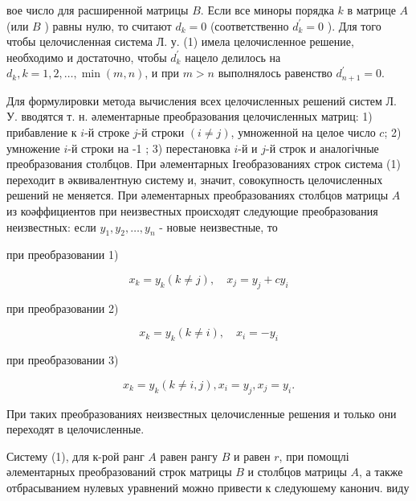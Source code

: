 \documentclass[10pt]{article}
\begin{document}
вое число для расширенной матрицы $B$. Если все миноры порядка $k$ в матрице $A$ (или $B$ ) равны нулю, то считают $d_{k}=0$ (соответственно $d_{k}^{\prime}=0$ ). Для того чтобы целочисленная система Л. у. (1) имела целочисленное решение, необходимо и достаточно, чтобы $d_{k}^{\prime}$ нацело делилось на $d_{k}, k=1,2, \ldots, \min (m, n)$, и при $m>n$ выполнялось равенство $d_{n+1}^{\prime}=0$.



Для формулировки метода вычисления всех целочисленных решений систем Л. У. вводятся т. н. әлементарные преобразования целочисленных матриц: 1) прибавление к $i$-й строке $j$-й строки $(i \neq j)$, умноженной на целое число $c$; 2) умножение $i$-й строки на -1 ; 3) перестановка $i$-й и $j$-й строк и аналогічные преобразования столбцов. При әлементарных Ігеобразованиях строк система (1) переходит в әквивалентную систему и, значит, совокупность целочисленных решений не меняется. При әлементарных преобразованиях столбцов матрицы $A$ из коәффициентов при неизвестных происходят следующие преобразования неизвестных: если $y_{1}, y_{2}, \ldots, y_{n}$ - новые неизвестные, то



при преобразовании 1)



\[

x_{k}=y_{k}(k \neq j), \quad x_{j}=y_{j}+c y_{i}

\]



при преобразовании 2)



\[

x_{k}=y_{k}(k \neq i), \quad x_{i}=-y_{i}

\]



при преобразовании 3)



\[

x_{k}=y_{k}(k \neq i, j), x_{i}=y_{j}, x_{j}=y_{i} .

\]



При таких преобразованиях неизвестных целочисленные решения и только они переходят в целочисленные.



Систему (1), для к-рой ранг $A$ равен рангу $B$ и равен $r$, при помощлі әлементарных преобразований строк матрицы $B$ и столбцов матрицы $A$, а также отбрасыванием нулевых уравнений можно привести к следуюшему канонич. виду
\end{document}
